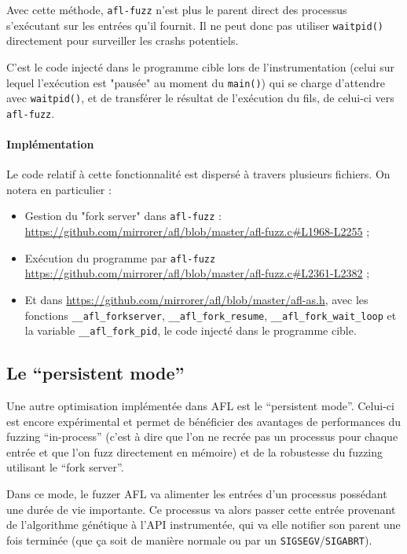 Avec cette méthode, \lstinline{afl-fuzz} n'est plus le parent direct des processus s'exécutant sur les entrées qu'il fournit.
Il ne peut donc pas utiliser \lstinline{waitpid()} directement pour surveiller les crashs potentiels.

C'est le code injecté dans le programme cible lors de l'instrumentation (celui sur lequel l'exécution est "pausée" au moment du \lstinline{main()}) qui se charge d'attendre avec \lstinline{waitpid()}, et de transférer le résultat de l'exécution du fils, de celui-ci vers \lstinline{afl-fuzz}.

\paragraph{Implémentation}

Le code relatif à cette fonctionnalité est dispersé à travers plusieurs fichiers.
On notera en particulier :
\begin{itemize}
  \item{} Gestion du "fork server" dans \lstinline{afl-fuzz} : \url{https://github.com/mirrorer/afl/blob/master/afl-fuzz.c#L1968-L2255} ;
  \item{} Exécution du programme par \lstinline{afl-fuzz} \url{https://github.com/mirrorer/afl/blob/master/afl-fuzz.c#L2361-L2382} ;
  \item{} Et dans \url{https://github.com/mirrorer/afl/blob/master/afl-as.h}, avec les fonctions \lstinline{__afl_forkserver}, \lstinline{__afl_fork_resume}, \lstinline{__afl_fork_wait_loop} et la variable \lstinline{__afl_fork_pid}, le code injecté dans le programme cible.
\end{itemize}

\subsection{Le ``persistent mode''}\label{persistent-mode}

Une autre optimisation implémentée dans AFL est le ``persistent mode''.
Celui-ci est encore expérimental et permet de bénéficier des avantages de performances du fuzzing ``in-process'' (c'est à dire que l'on ne recrée pas un processus pour chaque entrée et que l'on fuzz directement en mémoire) et de la robustesse du fuzzing utilisant le ``fork server''.

Dans ce mode, le fuzzer AFL va alimenter les entrées d'un processus possédant une durée de vie importante.
Ce processus va alors passer cette entrée provenant de l'algorithme génétique à l'API instrumentée, qui va elle notifier son parent une fois terminée (que ça soit de manière normale ou par un \lstinline{SIGSEGV}/\lstinline{SIGABRT}).

